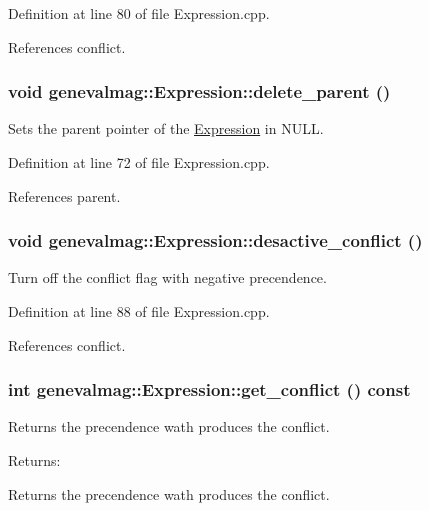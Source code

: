 Definition at line 80 of file Expression.cpp.

References conflict.\hypertarget{classgenevalmag_1_1Expression_bfc415a5ddd5ae05b1e9610a2f347203}{
\subsubsection[{delete\_\-parent}]{\setlength{\rightskip}{0pt plus 5cm}void genevalmag::Expression::delete\_\-parent ()}}
\label{classgenevalmag_1_1Expression_bfc415a5ddd5ae05b1e9610a2f347203}


Sets the parent pointer of the \hyperlink{classgenevalmag_1_1Expression}{Expression} in NULL. 

Definition at line 72 of file Expression.cpp.

References parent.\hypertarget{classgenevalmag_1_1Expression_a851daf99e3e04b3cf2bb2c7d53811f8}{
\subsubsection[{desactive\_\-conflict}]{\setlength{\rightskip}{0pt plus 5cm}void genevalmag::Expression::desactive\_\-conflict ()}}
\label{classgenevalmag_1_1Expression_a851daf99e3e04b3cf2bb2c7d53811f8}


Turn off the conflict flag with negative precendence. 

Definition at line 88 of file Expression.cpp.

References conflict.\hypertarget{classgenevalmag_1_1Expression_feaeebdfea5e8422299d152f8334034a}{
\subsubsection[{get\_\-conflict}]{\setlength{\rightskip}{0pt plus 5cm}int genevalmag::Expression::get\_\-conflict () const}}
\label{classgenevalmag_1_1Expression_feaeebdfea5e8422299d152f8334034a}


Returns the precendence wath produces the conflict. \begin{Desc}
\item[Returns:]\end{Desc}
Returns the precendence wath produces the conflict. 

